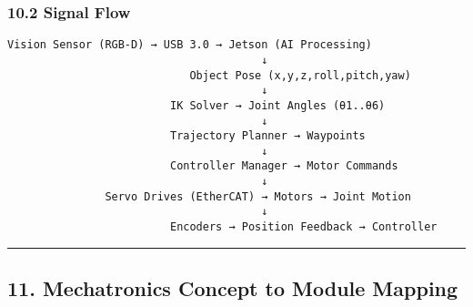 \documentclass[
]{article}
\begin{document}
\hypertarget{signal-flow}{%
\subsubsection{10.2 Signal Flow}\label{signal-flow}}

\begin{verbatim}
Vision Sensor (RGB-D) → USB 3.0 → Jetson (AI Processing)
                                       ↓
                            Object Pose (x,y,z,roll,pitch,yaw)
                                       ↓
                         IK Solver → Joint Angles (θ1..θ6)
                                       ↓
                         Trajectory Planner → Waypoints
                                       ↓
                         Controller Manager → Motor Commands
                                       ↓
               Servo Drives (EtherCAT) → Motors → Joint Motion
                                       ↓
                         Encoders → Position Feedback → Controller
\end{verbatim}

\begin{center}\rule{0.5\linewidth}{0.5pt}\end{center}

\hypertarget{mechatronics-concept-to-module-mapping}{%
\subsection{11. Mechatronics Concept to Module
Mapping}\label{mechatronics-concept-to-module-mapping}}
\end{document}
